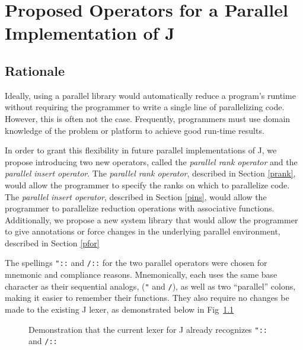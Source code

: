 \chapter{Proposed Operators for a Parallel Implementation of J} 
\label{paraop}

\section{Rationale}
Ideally, using a parallel library would automatically reduce a program's runtime
without requiring the programmer to write a single line of parallelizing code. 
However, this is often not the case. 
Frequently, programmers must use domain knowledge of the problem or platform to achieve good run-time results. 

In order to grant this flexibility in future parallel implementations of J, 
we propose introducing two new operators, called the \textit{parallel rank operator} 
and the \textit{parallel insert operator}.
The \textit{parallel rank operator}, described in Section \ref{prank}, 
would allow the programmer to specify the ranks on which to parallelize code.
The \textit{parallel insert operator}, described in Section \ref{pins}, 
would allow the programmer to parallelize reduction operations with associative functions.
Additionally, we propose a new system library
that would allow the programmer to give annotations or force changes in the underlying parallel environment,
described in Section \ref{pfor}

The spellings \texttt{"::}  and \texttt{/::} for the two parallel operators were chosen for mnemonic and compliance reasons.
Mnemonically, each uses the same base character as their sequential analogs, (\texttt{"} and \texttt{/}), 
as well as two ``parallel'' colons, making it easier to remember their functions.
They also require no changes be made to the existing J lexer\cite{ioj}, 
as demonstrated below in Fig~\ref{fig:jlexer-pres}

\begin{figure}[htbp]
\begin{quote}
\begin{singlespacing}
\begin{small}
\end{small}
\end{singlespacing}
\end{quote}
\caption{Demonstration that the current lexer for J already recognizes \texttt{"::} and \texttt{/::}}
\label{fig:jlexer-pres}
\end{figure}


